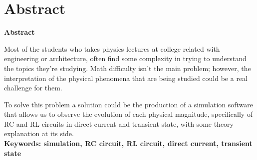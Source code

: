\documentclass[../main.tex]{subfiles}
\begin{document}
\makeatletter
\renewenvironment{abstract}{%
    \if@twocolumn
      \section*{Abstract \\}%
    \else %
    \begin{flushright}
        {\filleft\Huge\bfseries\fontsize{48pt}{12}\selectfont Abstract\vspace{\z@}}%
        \end{flushright}
      \quotation
    \fi}
    {\if@twocolumn\else\endquotation\fi}
\makeatother
\begin{abstract}

Most of the students who takes physics lectures at college related with engineering or architecture, often find some complexity in trying to understand the topics they're studying. Math difficulty isn't the main problem; however, the interpretation of the physical phenomena that are being studied could be a real challenge for them.

To solve this problem a solution could be the production of a simulation software that allows us to observe the evolution of each physical magnitude, specifically of RC and RL circuits in direct current and transient state, with some theory explanation at its side. \\



\bfseries{\large{Keywords:}} simulation, RC circuit, RL circuit, direct current, transient state

\end{abstract}
\end{document}
